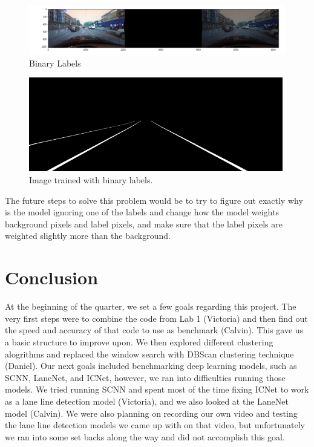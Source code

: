 \documentclass[twoside,twocolumn]{article}
\begin{document}
\begin{figure}
  \includegraphics[width=\linewidth]{8.png}
  \caption{Binary Labels}
  \label{fig:labels2}
\end{figure}

\begin{figure}
  \includegraphics[width=\linewidth]{9.png}
  \caption{Image trained with binary labels.}
  \label{fig:badbad}
\end{figure}

\par The future steps to solve this problem would be to try to figure out exactly why is the model ignoring one of the labels and change how the model weights background pixels and label pixels, and make sure that the label pixels are weighted slightly more than the background.


\section{Conclusion}
At the beginning of the quarter, we set a few goals regarding this project. The very first steps were to combine the code from Lab 1 (Victoria) and then find out the speed and accuracy of that code to use as benchmark (Calvin). This gave us a basic structure to improve upon. We then explored different clustering alogrithms and replaced the window search with DBScan clustering technique (Daniel). Our next goals included benchmarking deep learning models, such as SCNN, LaneNet, and ICNet, however, we ran into difficulties running those models. We tried running SCNN and spent most of the time fixing ICNet to work as a lane line detection model (Victoria), and we also looked at the LaneNet model (Calvin). We were also planning on recording our own video and testing the lane line detection models we came up with on that video, but unfortunately we ran into some set backs along the way and did not accomplish this goal.

\end{document}
